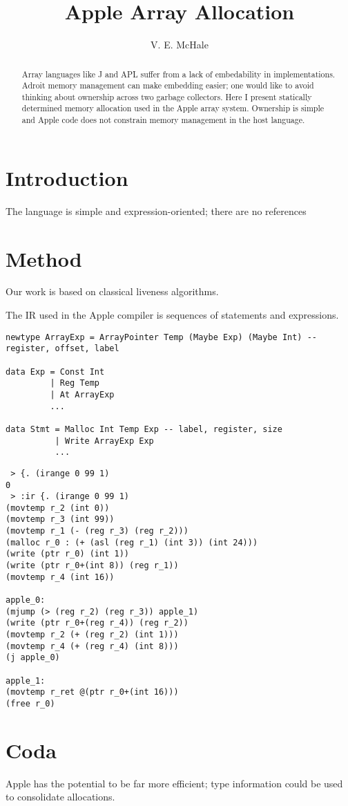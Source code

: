 \documentclass{article}
\begin{document}
\title{Apple Array Allocation}
\author{V. E. McHale}
\maketitle

\begin{abstract}
    Array languages like J and APL suffer from a lack of embedability in implementations. Adroit memory management can make embedding easier; one would like to avoid thinking about ownership across two garbage collectors. Here I present statically determined memory allocation used in the Apple array system. Ownership is simple and Apple code does not constrain memory management in the host language.
\end{abstract}

\section{Introduction}

The language is simple and expression-oriented; there are no references

\section{Method}

Our work is based on classical liveness algorithms.

The IR used in the Apple compiler is sequences of statements and expressions.

\begin{verbatim}
newtype ArrayExp = ArrayPointer Temp (Maybe Exp) (Maybe Int) -- register, offset, label

data Exp = Const Int
         | Reg Temp
         | At ArrayExp
         ...

data Stmt = Malloc Int Temp Exp -- label, register, size
          | Write ArrayExp Exp
          ...
\end{verbatim}

\begin{verbatim}
 > {. (irange 0 99 1)
0
 > :ir {. (irange 0 99 1)
(movtemp r_2 (int 0))
(movtemp r_3 (int 99))
(movtemp r_1 (- (reg r_3) (reg r_2)))
(malloc r_0 : (+ (asl (reg r_1) (int 3)) (int 24)))
(write (ptr r_0) (int 1))
(write (ptr r_0+(int 8)) (reg r_1))
(movtemp r_4 (int 16))

apple_0:
(mjump (> (reg r_2) (reg r_3)) apple_1)
(write (ptr r_0+(reg r_4)) (reg r_2))
(movtemp r_2 (+ (reg r_2) (int 1)))
(movtemp r_4 (+ (reg r_4) (int 8)))
(j apple_0)

apple_1:
(movtemp r_ret @(ptr r_0+(int 16)))
(free r_0)
\end{verbatim}

\section{Coda}

Apple has the potential to be far more efficient; type information could be used to consolidate allocations.
\end{document}
